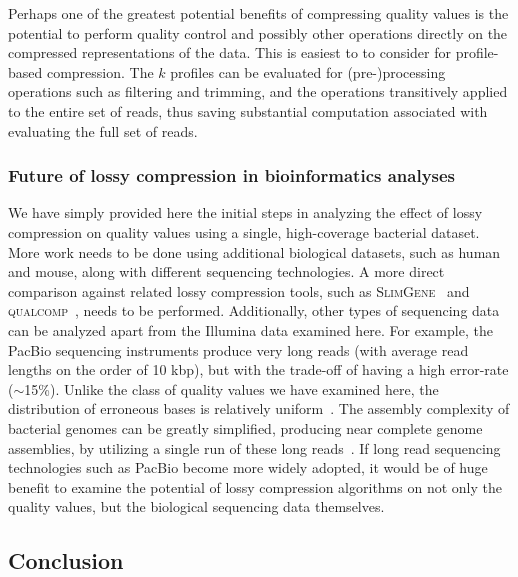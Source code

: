 \documentclass[12pt,\mydriver]{thesis}
\begin{document}
Perhaps one of the greatest potential benefits of compressing quality
values is the potential to perform quality control and possibly other
operations directly on the compressed representations of the
data. This is easiest to to consider for profile-based
compression. The $k$ profiles can be evaluated for (pre-)processing
operations such as filtering and trimming, and the operations
transitively applied to the entire set of reads, thus saving
substantial computation associated with evaluating the full set of
reads.

\subsubsection{Future of lossy compression in bioinformatics analyses}

We have simply provided here the initial steps in analyzing the effect
of lossy compression on quality values using a single,
high-coverage bacterial dataset. More work needs to be done using
additional biological datasets, such as human and mouse, along with
different sequencing technologies. A more direct comparison against
related lossy compression tools, such as
\textsc{SlimGene}~\cite{Kozanitis:2011kl} and
\textsc{\textsc{q}ual\textsc{c}omp}~\cite{Ochoa:2013rt}, needs to be
performed. Additionally, other types of sequencing data can be
analyzed apart from the Illumina data examined here. For example, the
PacBio sequencing instruments produce very long reads (with average
read lengths on the order of 10 kbp), but with the trade-off of having
a high error-rate ($\sim$15\%). Unlike the class of quality values we
have examined here, the distribution of erroneous bases is relatively
uniform~\cite{Ferrarini:2013vf}. The assembly complexity of bacterial
genomes can be greatly simplified, producing near complete genome
assemblies, by utilizing a single run of these long
reads~\cite{Koren:2013ye}. If long read sequencing technologies such
as PacBio become more widely adopted, it would be of huge benefit to
examine the potential of lossy compression algorithms on not only the
quality values, but the biological sequencing data themselves.



\subsection{Conclusion}
\end{document}
